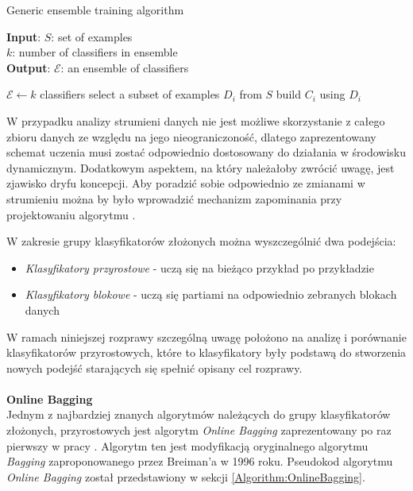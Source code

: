 \begin{algorithm}
    \caption{Generic ensemble training algorithm \cite{PHD:Kirkby}}\label{Algorithm:Ensemlbe}
    \textbf{Input}: $S$: set of examples \\
    \hspace*{12mm} $k$: number of classifiers in ensemble \\
    \textbf{Output}: $\mathcal{E}$: an ensemble of classifiers \\
    \begin{algorithmic}[1]
    \State $\mathcal{E} \gets k$ classifiers
    \State select a subset of examples $D_i$ from $S$
    \State build $C_i$ using $D_i$
    \EndFor
    \end{algorithmic}
\end{algorithm}

\noindent W przypadku analizy strumieni danych nie jest możliwe skorzystanie z całego zbioru danych ze względu na jego nieograniczoność, dlatego zaprezentowany schemat uczenia musi zostać odpowiednio dostosowany do działania w środowisku dynamicznym. Dodatkowym aspektem, na który należałoby zwrócić uwagę, jest zjawisko dryfu koncepcji. Aby poradzić sobie odpowiednio ze zmianami w strumieniu można by było wprowadzić mechanizm zapominania przy projektowaniu algorytmu \cite{BrzezPhd2015}.

\newpage

\noindent W zakresie grupy klasyfikatorów złożonych można wyszczególnić dwa podejścia:

\begin{itemize}
    \item \textit{Klasyfikatory przyrostowe} - uczą się na bieżąco przykład po przykładzie
    \item \textit{Klasyfikatory blokowe} - uczą się partiami na odpowiednio zebranych blokach danych
\end{itemize}

\noindent W ramach niniejszej rozprawy szczególną uwagę położono na  analizę i porównanie klasyfikatorów przyrostowych, które to klasyfikatory były podstawą do stworzenia nowych podejść starających się spełnić opisany cel rozprawy.\\\\
\textbf{Online Bagging}\\

\noindent Jednym z najbardziej znanych algorytmów należących do grupy klasyfikatorów złożonych, przyrostowych jest algorytm \textit{Online Bagging} zaprezentowany po raz pierwszy w pracy \cite{Article:OnlineBagging}. Algorytm ten jest modyfikacją oryginalnego algorytmu \textit{Bagging} zaproponowanego przez Breiman'a w 1996 roku. Pseudokod algorytmu \textit{Online Bagging} został przedstawiony w sekcji \ref{Algorithm:OnlineBagging}.

